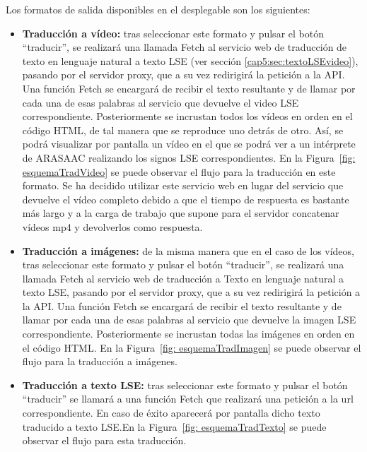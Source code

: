 Los formatos de salida disponibles en el desplegable son los siguientes:

\begin{itemize}

	\item \textbf{Traducción a vídeo:} tras seleccionar este formato y pulsar el botón ``traducir'', se realizará una llamada Fetch al servicio web de traducción de texto en lenguaje natural a texto LSE (ver sección \ref{cap5:sec:textoLSEvideo}), pasando por el servidor proxy, que a su vez redirigirá la petición a la API. Una función Fetch se encargará de recibir el texto resultante y de llamar por cada una de esas palabras al servicio que devuelve el video LSE correspondiente. Posteriormente se incrustan todos los vídeos en orden en el código HTML, de tal manera que se reproduce uno detrás de otro. Así, se podrá visualizar por pantalla un vídeo en el que se podrá ver a un intérprete de ARASAAC realizando los signos LSE correspondientes. En la Figura~\ref {fig: esquemaTradVideo} se puede observar el flujo para la traducción en este formato. Se ha decidido utilizar este servicio web en lugar del servicio que devuelve el vídeo completo debido a que el tiempo de respuesta es bastante más largo y a la carga de trabajo que supone para el servidor concatenar vídeos mp4 y devolverlos como respuesta.
	

	
	\item \textbf{Traducción a imágenes:} de la misma manera que en el caso de los vídeos, tras seleccionar este formato y pulsar el botón ``traducir'', se realizará una llamada Fetch  al servicio web de traducción a Texto en lenguaje natural a texto LSE, pasando por el servidor proxy, que a su vez redirigirá la petición a la API. Una función Fetch se encargará de recibir el texto resultante y de llamar por cada una de esas palabras al servicio que devuelve la imagen LSE correspondiente. Posteriormente se incrustan todas las imágenes en orden en el código HTML. En la Figura~\ref {fig: esquemaTradImagen} se puede observar el flujo para la traducción a imágenes.

	\item \textbf{Traducción a texto LSE:} tras seleccionar este formato y pulsar el botón ``traducir'' se llamará a una función Fetch que realizará una petición a la url correspondiente. En caso de éxito aparecerá por pantalla dicho texto traducido a texto LSE.En la Figura~\ref {fig: esquemaTradTexto} se puede observar el flujo para esta traducción.

\end{itemize}


